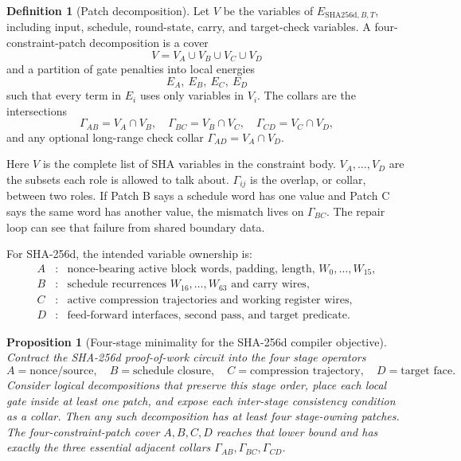 \documentclass[11pt]{article}
\newtheorem{proposition}[theorem]{Proposition}
\theoremstyle{definition}
\newtheorem{definition}[theorem]{Definition}
\theoremstyle{remark}
\newcommand{\shaD}{\mathrm{SHA256d}}
\begin{document}
\begin{definition}[Patch decomposition]
Let \(V\) be the variables of \(E_{\shaD,B,T}\), including input, schedule,
round-state, carry, and target-check variables. A four-constraint-patch decomposition is a
cover
\[
V=V_A\cup V_B\cup V_C\cup V_D
\]
and a partition of gate penalties into local energies
\[
E_A,\ E_B,\ E_C,\ E_D
\]
such that every term in \(E_i\) uses only variables in \(V_i\). The collars are
the intersections
\[
\Gamma_{AB}=V_A\cap V_B,\quad
\Gamma_{BC}=V_B\cap V_C,\quad
\Gamma_{CD}=V_C\cap V_D,
\]
and any optional long-range check collar \(\Gamma_{AD}=V_A\cap V_D\).
\end{definition}

Here \(V\) is the complete list of SHA variables in the constraint body.
\(V_A,\ldots,V_D\) are the subsets each role is allowed to talk about.
\(\Gamma_{ij}\) is the overlap, or collar, between two roles. If Patch B says a
schedule word has one value and Patch C says the same word has another value,
the mismatch lives on \(\Gamma_{BC}\). The repair loop can see that failure from
shared boundary data.

For SHA-256d, the intended variable ownership is:
\[
\begin{array}{lll}
A&:&\text{nonce-bearing active block words, padding, length, }W_0,\ldots,W_{15},\\
B&:&\text{schedule recurrences }W_{16},\ldots,W_{63}\text{ and carry wires},\\
C&:&\text{active compression trajectories and working register wires},\\
D&:&\text{feed-forward interfaces, second pass, and target predicate.}
\end{array}
\]

\begin{proposition}[Four-stage minimality for the SHA-256d compiler objective]
\label{prop:fourminimal}
Contract the SHA-256d proof-of-work circuit into the four stage operators
\[
A=\text{nonce/source},\quad
B=\text{schedule closure},\quad
C=\text{compression trajectory},\quad
D=\text{target face}.
\]
Consider logical decompositions that preserve this stage order, place each
local gate inside at least one patch, and expose each inter-stage consistency
condition as a collar. Then any such decomposition has at least four
stage-owning patches. The four-constraint-patch cover \(A,B,C,D\) reaches that lower
bound and has exactly the three essential adjacent collars
\(\Gamma_{AB},\Gamma_{BC},\Gamma_{CD}\).
\end{proposition}
\end{document}
